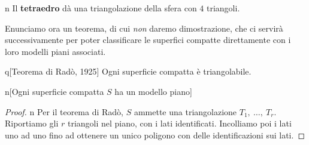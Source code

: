\begin{example}{n}
	Il \textbf{tetraedro} dà una triangolazione della sfera con $4$ triangoli.
\end{example}
Enunciamo ora un teorema, di cui \textit{non} daremo dimostrazione, che ci servirà successivamente per poter classificare le superfici compatte direttamente con i loro modelli piani associati.
\begin{theorem}{q}[Teorema di Radò, 1925]
	Ogni superficie compatta è triangolabile.\qedhere
\end{theorem}
\begin{corollary}{n}[Ogni superficie compatta $S$ ha un modello piano]
\end{corollary}
\begin{proof}{n}
	Per il teorema di Radò, $S$ ammette una triangolazione $T_1,\ \ldots,\ T_r$. Riportiamo gli $r$ triangoli nel piano, con i lati identificati. Incolliamo poi i lati uno ad uno fino ad ottenere un unico poligono con delle identificazioni sui lati.\qedhere
\end{proof}
